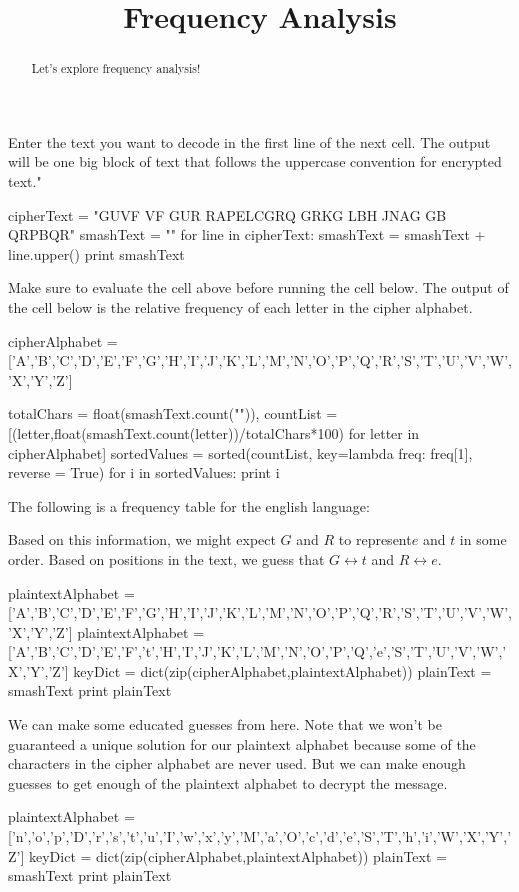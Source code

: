 \documentclass[handout]{ximera}
\title{Frequency Analysis}
\begin{document}
\begin{abstract}{Let's explore frequency analysis!}\end{abstract}
\maketitle

Enter the text you want to decode in the first line of the next cell.  The output will be one big block of text that follows the uppercase convention for encrypted text."

\begin{python}
cipherText = "GUVF VF GUR RAPELCGRQ GRKG LBH JNAG GB QRPBQR"
smashText =  ""
for line in cipherText:
	smashText = smashText + line.upper()
     	print smashText
\end{python}
Make sure to evaluate the cell above before running the cell below.  The output of the cell below is the relative frequency of each letter in the cipher alphabet.

\begin{python}
cipherAlphabet = ['A','B','C','D','E','F','G','H','I','J','K','L','M','N','O','P','Q','R','S','T','U','V','W','X','Y','Z']

totalChars = float(smashText.count("")),
countList = [(letter,float(smashText.count(letter))/totalChars*100) for letter in cipherAlphabet]
sortedValues = sorted(countList, key=lambda freq: freq[1], reverse = True)
for i in sortedValues:
	print i
\end{python}

The following is a frequency table for the english language:


Based on this information, we might expect $G$ and $R$ to represent$ e$ and $t$ in some order.  Based on positions in the text, we guess that $G \leftrightarrow t$ and $R \leftrightarrow e$.

\begin{python}
plaintextAlphabet = ['A','B','C','D','E','F','G','H','I','J','K','L','M','N','O','P','Q','R','S','T','U','V','W','X','Y','Z']
plaintextAlphabet = ['A','B','C','D','E','F','t','H','I','J','K','L','M','N','O','P','Q','e','S','T','U','V','W','X','Y','Z']
keyDict = dict(zip(cipherAlphabet,plaintextAlphabet))
plainText = smashText
print plainText
\end{python}

We can make some educated guesses from here. Note that we won't be guaranteed a unique solution for our plaintext alphabet because some of the characters in the cipher alphabet are never used.  But we can make enough guesses to get enough of the plaintext alphabet to decrypt the message.
  
\begin{python}
plaintextAlphabet = ['n','o','p','D','r','s','t','u','I','w','x','y','M','a','O','c','d','e','S','T','h','i','W','X','Y','Z']
keyDict = dict(zip(cipherAlphabet,plaintextAlphabet))
plainText = smashText
print plainText
\end{python}
\end{document}
